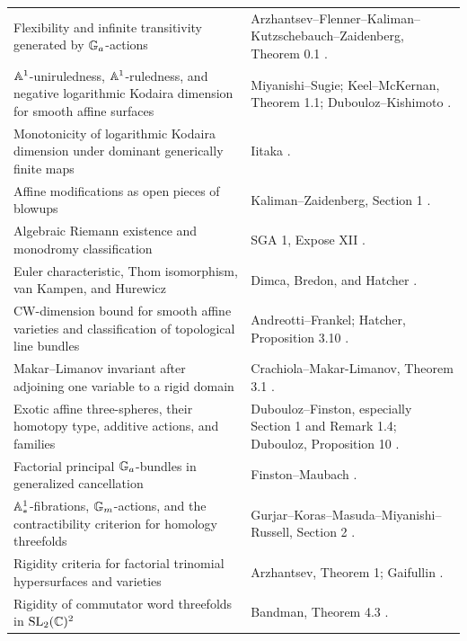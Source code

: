 \begin{longtable}{>{\raggedright\arraybackslash}p{}p{}}
Flexibility and infinite transitivity generated by $\mathbb G_a$-actions & Arzhantsev--Flenner--Kaliman--Kutzschebauch--Zaidenberg, Theorem 0.1 \cite{ArzhantsevEtAl2013}. \\
$\mathbb A^1$-uniruledness, $\mathbb A^1$-ruledness, and negative logarithmic Kodaira dimension for smooth affine surfaces & Miyanishi--Sugie; Keel--McKernan, Theorem 1.1; Dubouloz--Kishimoto \cite{MiyanishiSugie1980,KeelMcKernan1999,DuboulozKishimoto2015}. \\
Monotonicity of logarithmic Kodaira dimension under dominant generically finite maps & Iitaka \cite{Iitaka1977}. \\
Affine modifications as open pieces of blowups & Kaliman--Zaidenberg, Section 1 \cite{KalimanZaidenberg1999}. \\
Algebraic Riemann existence and monodromy classification & SGA 1, Expose XII \cite{SGA1}. \\
Euler characteristic, Thom isomorphism, van Kampen, and Hurewicz & Dimca, Bredon, and Hatcher \cite{Dimca2004,Bredon1993,Hatcher2002}. \\
CW-dimension bound for smooth affine varieties and classification of topological line bundles & Andreotti--Frankel; Hatcher, Proposition 3.10 \cite{AndreottiFrankel1959,HatcherVBKT}. \\
Makar--Limanov invariant after adjoining one variable to a rigid domain & Crachiola--Makar-Limanov, Theorem 3.1 \cite{CrachiolaMakarLimanov2008}. \\
Exotic affine three-spheres, their homotopy type, additive actions, and families & Dubouloz--Finston, especially Section 1 and Remark 1.4; Dubouloz, Proposition 10 \cite{DuboulozFinston2014,Dubouloz2018Families}. \\
Factorial principal $\mathbb G_a$-bundles in generalized cancellation & Finston--Maubach \cite{FinstonMaubach2008}. \\
$\mathbb A^1_*$-fibrations, $\mathbb G_m$-actions, and the contractibility criterion for homology threefolds & Gurjar--Koras--Masuda--Miyanishi--Russell, Section 2 \cite{GurjarKorasMasudaMiyanishiRussell2013}. \\
Rigidity criteria for factorial trinomial hypersurfaces and varieties & Arzhantsev, Theorem 1; Gaifullin \cite{Arzhantsev2016,Gaifullin2019}. \\
Rigidity of commutator word threefolds in $\operatorname{SL}_2(\mathbb C)^2$ & Bandman, Theorem 4.3 \cite{Bandman2026Word}. \\
\bottomrule
\end{longtable}

